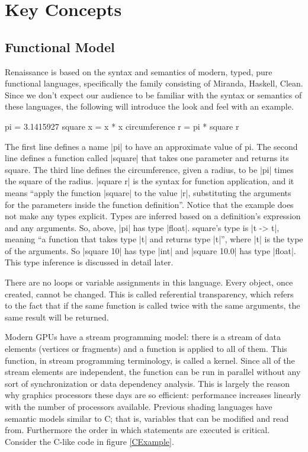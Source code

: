 \documentclass[review]{acmsiggraph}      %
\begin{document}
\section{Key Concepts}

\subsection{Functional Model}

Renaissance is based on the syntax and semantics of modern, typed,
pure functional languages, specifically the family consisting of
Miranda, Haskell, Clean.  Since we don't expect our audience to be
familiar with the syntax or semantics of these languages, the
following will introduce the look and feel with an example.

\begin{MyVerb}
pi = 3.1415927
square x = x * x
circumference r = pi * square r
\end{MyVerb}

The first line defines a name |pi| to have an approximate value of pi.
The second line defines a function called |square| that takes one
parameter and returns its square.  The third line defines the
circumference, given a radius, to be |pi| times the square of the
radius.  |square r| is the syntax for function application, and it
means ``apply the function |square| to the value |r|, substituting the
arguments for the parameters inside the function definition''.  Notice
that the example does not make any types explicit.  Types are inferred
based on a definition's expression and any arguments.  So, above, |pi|
has type |float|.  square's type is |t -> t|, meaning ``a function
that takes type |t| and returns type |t|'', where |t| is the type of
the arguments.  So |square 10| has type |int| and |square 10.0| has
type |float|.  This type inference is discussed in detail later.

There are no loops or variable assignments in this language.  Every
object, once created, cannot be changed.  This is called referential
transparency, which refers to the fact that if the same function
is called twice with the same arguments, the same result will be
returned.

Modern GPUs have a stream programming model: there is a stream of data
elements (vertices or fragments) and a function is applied to all
of them.  This function, in stream programming terminology, is called
a kernel.  Since all of the stream elements are independent, the
function can be run in parallel without any sort of synchronization or
data dependency analysis.  This is largely the reason why graphics
processors these days are so efficient: performance increases linearly
with the number of processors available.  Previous shading languages
have semantic models similar to C; that is, variables that can be
modified and read from.  Furthermore the order in which statements are
executed is critical.  Consider the C-like code in figure \ref{CExample}.
\end{document}
